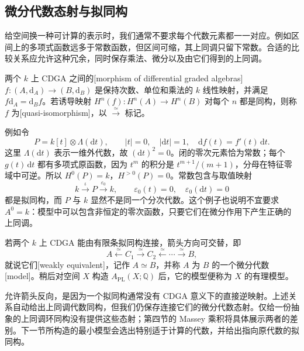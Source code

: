 \subsection{微分代数态射与拟同构}
\label{g2:subsec:E01:02}

给空间换一种可计算的表示时，我们通常不要求每个代数元素都一一对应。例如区间上的多项式函数远多于常数函数，但区间可缩，其上同调只留下常数。合适的比较关系应允许这种冗余，同时保存乘法、微分以及由它们得到的上同调。

\begin{definition}\label{g2:def:cdga-quasi-isomorphism}
	两个 \(k\) 上 CDGA 之间的[morphism of differential graded algebras] \(f:(A,\mathrm d_A)\to(B,\mathrm d_B)\) 是保持次数、单位和乘法的 \(k\) 线性映射，并满足 \(f\mathrm d_A=\mathrm d_Bf\)。若诱导映射 \(H^n(f):H^n(A)\to H^n(B)\) 对每个 \(n\) 都是同构，则称 \(f\) 为[quasi-isomorphism]，以 \(\xrightarrow{\simeq}\) 标记。
\end{definition}

例如令
\[
	P=k[t]\otimes\Lambda(\mathrm dt),\qquad |t|=0,\quad |\mathrm dt|=1,\quad
	\mathrm d f(t)=f'(t)\,\mathrm dt.
\]
这里 \(\Lambda(\mathrm dt)\) 表示一维外代数，故 \((\mathrm dt)^2=0\)。闭的零次元素恰为常数；每个 \(g(t)\,\mathrm dt\) 都有多项式原函数，因为 \(t^m\) 的积分是 \(t^{m+1}/(m+1)\)，分母在特征零域中可逆。所以 \(H^0(P)=k\)，\(H^{>0}(P)=0\)。常数包含与取值映射
\[
	k\xrightarrow{\ \iota\ }P\xrightarrow{\ \varepsilon_0\ }k,\qquad
	\varepsilon_0(t)=0,\quad\varepsilon_0(\mathrm dt)=0
\]
都是拟同构，而 \(P\) 与 \(k\) 显然不是同一个分次代数。这个例子也说明不宜要求 \(A^0=k\)：模型中可以包含非恒定的零次函数，只要它们在微分作用下产生正确的上同调。

\begin{definition}\label{g2:def:cdga-model}
	若两个 \(k\) 上 CDGA 能由有限条拟同构连接，箭头方向可交替，即
	\[
		A\xleftarrow{\simeq}C_1\xrightarrow{\simeq}C_2\xleftarrow{\simeq}\cdots\xrightarrow{\simeq}B,
	\]
	就说它们[weakly equivalent]，记作 \(A\simeq B\)，并称 \(A\) 为 \(B\) 的一个微分代数[model]。稍后对空间 \(X\) 构造 \(A_{\mathrm{PL}}(X;\mathbb Q)\) 后，它的模型便称为 \(X\) 的有理模型。
\end{definition}

允许箭头反向，是因为一个拟同构通常没有 CDGA 意义下的直接逆映射。上述关系自动给出上同调代数同构，但我们仍保存连接它们的微分代数态射。仅给一份抽象的上同调环同构没有提供这些态射；第四节的 Massey 乘积将具体展示两者的差别。下一节所构造的最小模型会选出特别适于计算的代数，并给出指向原代数的拟同构。

